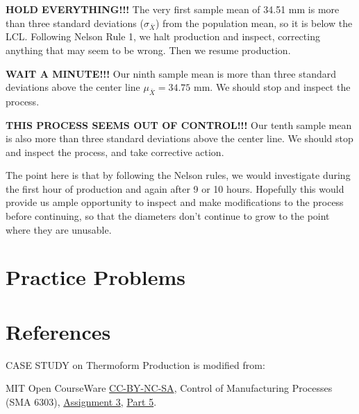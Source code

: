\documentclass{ximera}
\begin{document}

\textbf{HOLD EVERYTHING!!!}  The very first sample mean of 34.51 mm is more than three standard deviations ($\sigma_{\bar{X}}$) from the population mean, so it is below the LCL.  %
Following Nelson Rule 1, we halt production and inspect, correcting anything that may seem to be wrong.  Then we resume production.

\textbf{WAIT A MINUTE!!!}  Our ninth sample mean is more than three standard deviations above the center line $\mu_{\bar{X}}=34.75$ mm.  We should stop and inspect the process.

\textbf{THIS PROCESS SEEMS OUT OF CONTROL!!!}  Our tenth sample mean is also more than three standard deviations above the center line.  We should stop and inspect the process, and take corrective action.

The point here is that by following the Nelson rules, we would investigate during the first hour of production and again after 9 or 10 hours.  Hopefully this would provide us ample opportunity to inspect and make modifications to the process before continuing, so that the diameters don't continue to grow to the point where they are unusable.

\section*{Practice Problems}

\section*{References}
CASE STUDY on Thermoform Production is modified from:

MIT Open CourseWare \href{https://creativecommons.org/licenses/by-nc-sa/4.0/}{CC-BY-NC-SA}, Control of Manufacturing Processes (SMA 6303), \href{https://ocw.mit.edu/courses/2-830j-control-of-manufacturing-processes-sma-6303-spring-2008/resources/ps3/}{Assignment 3}, \href{https://ocw.mit.edu/courses/2-830j-control-of-manufacturing-processes-sma-6303-spring-2008/resources/35/}{Part 5}. 
\end{document}
